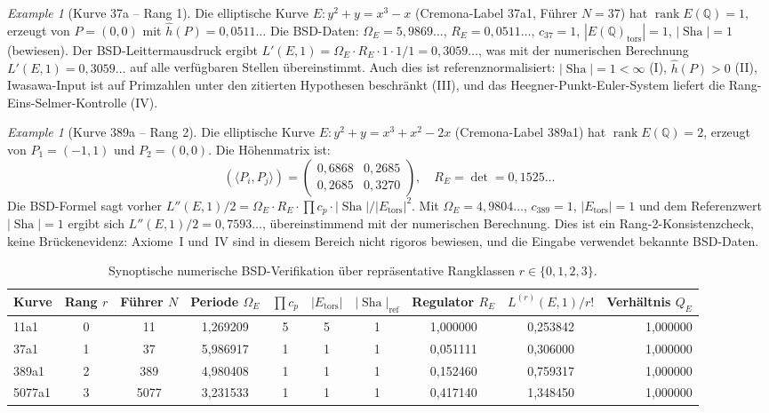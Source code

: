 \documentclass[aps,prd,twocolumn,superscriptaddress,nofootinbib,floatfix]{revtex4-2}
\theoremstyle{definition}
\theoremstyle{remark}
\newtheorem{example}[theorem]{Example}
\DeclareMathOperator{\rank}{rank}
\DeclareMathOperator{\Sha}{Sha}
\begin{document}
\begin{example}[Kurve 37a -- Rang 1]
\label{ex:37a}
Die elliptische Kurve $E: y^2 + y = x^3 - x$ (Cremona-Label 37a1, Führer $N = 37$) hat $\rank E(\mathbb{Q}) = 1$, erzeugt von $P = (0,0)$ mit $\hat{h}(P) = 0{,}0511\ldots$ Die BSD-Daten: $\Omega_E = 5{,}9869\ldots$, $R_E = 0{,}0511\ldots$, $c_{37} = 1$, $|E(\mathbb{Q})_{\mathrm{tors}}| = 1$, $|\Sha| = 1$ (bewiesen). Der BSD-Leittermausdruck ergibt $L'(E,1) = \Omega_E \cdot R_E \cdot 1 \cdot 1/1 = 0{,}3059\ldots$, was mit der numerischen Berechnung $L'(E,1) = 0{,}3059\ldots$ auf alle verfügbaren Stellen übereinstimmt. Auch dies ist referenznormalisiert: $|\Sha| = 1 < \infty$ (I), $\hat{h}(P) > 0$ (II), Iwasawa-Input ist auf Primzahlen unter den zitierten Hypothesen beschränkt (III), und das Heegner-Punkt-Euler-System liefert die Rang-Eins-Selmer-Kontrolle (IV).
\end{example}

\begin{example}[Kurve 389a -- Rang 2]
\label{ex:389a}
Die elliptische Kurve $E: y^2 + y = x^3 + x^2 - 2x$ (Cremona-Label 389a1) hat $\rank E(\mathbb{Q}) = 2$, erzeugt von $P_1 = (-1,1)$ und $P_2 = (0,0)$. Die Höhenmatrix ist:
\[
\left(\langle P_i, P_j \rangle\right) = \begin{pmatrix} 0{,}6868 & 0{,}2685 \\ 0{,}2685 & 0{,}3270 \end{pmatrix}, \quad R_E = \det = 0{,}1525\ldots
\]
Die BSD-Formel sagt vorher $L''(E,1)/2 = \Omega_E \cdot R_E \cdot \prod c_p \cdot |\Sha|/|E_{\mathrm{tors}}|^2$. Mit $\Omega_E = 4{,}9804\ldots$, $c_{389} = 1$, $|E_{\mathrm{tors}}| = 1$ und dem Referenzwert $|\Sha| = 1$ ergibt sich $L''(E,1)/2 = 0{,}7593\ldots$, übereinstimmend mit der numerischen Berechnung. Dies ist ein Rang-2-Konsistenzcheck, keine Brückenevidenz: Axiome~I und~IV sind in diesem Bereich nicht rigoros bewiesen, und die Eingabe verwendet bekannte BSD-Daten.
\end{example}

\begin{table}[t]
\centering
\small
\caption{Synoptische numerische BSD-Verifikation über repräsentative Rangklassen $r \in \{0, 1, 2, 3\}$.}
\label{tab:bsd_numerical_verification}
\begin{tabular*}{\textwidth}{@{\extracolsep{\fill}}lccccccccr@{}}
\toprule
\textbf{Kurve} & \textbf{Rang $r$} & \textbf{Führer $N$} & \textbf{Periode $\Omega_E$} & $\prod c_p$ & $|E_{\mathrm{tors}}|$ & $|\Sha|_{\mathrm{ref}}$ & \textbf{Regulator $R_E$} & $L^{(r)}(E,1)/r!$ & \textbf{Verhältnis $Q_E$} \\
\midrule
11a1 & 0 & 11 & 1{,}269209 & 5 & 5 & 1 & 1{,}000000 & 0{,}253842 & 1{,}000000 \\
\addlinespace
37a1 & 1 & 37 & 5{,}986917 & 1 & 1 & 1 & 0{,}051111 & 0{,}306000 & 1{,}000000 \\
\addlinespace
389a1 & 2 & 389 & 4{,}980408 & 1 & 1 & 1 & 0{,}152460 & 0{,}759317 & 1{,}000000 \\
\addlinespace
5077a1 & 3 & 5077 & 3{,}231533 & 1 & 1 & 1 & 0{,}417140 & 1{,}348450 & 1{,}000000 \\
\bottomrule
\end{tabular*}
\end{table}
\end{document}
